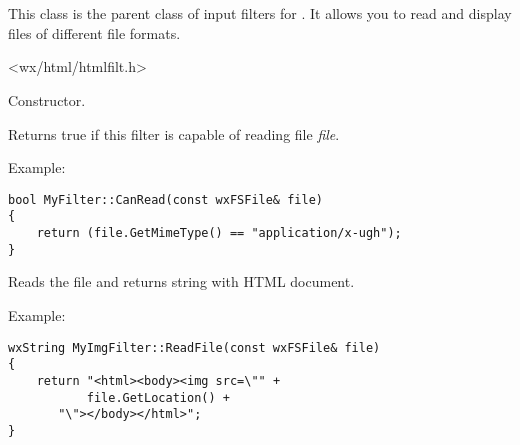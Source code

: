 %
%

\section{}\label{wxhtmlfilter}

This class is the parent class of input filters for .
It allows you to read and display files of different file formats.




<wx/html/htmlfilt.h>





\label{wxhtmlfilterwxhtmlfilter}


Constructor.

\label{wxhtmlfiltercanread}


Returns true if this filter is capable of reading file {\it file}.

Example:

\begin{verbatim}
bool MyFilter::CanRead(const wxFSFile& file)
{
    return (file.GetMimeType() == "application/x-ugh");
}
\end{verbatim}

\label{wxhtmlfilterreadfile}


Reads the file and returns string with HTML document.

Example:

\begin{verbatim}
wxString MyImgFilter::ReadFile(const wxFSFile& file)
{
    return "<html><body><img src=\"" +
           file.GetLocation() +
	   "\"></body></html>";
}
\end{verbatim}

